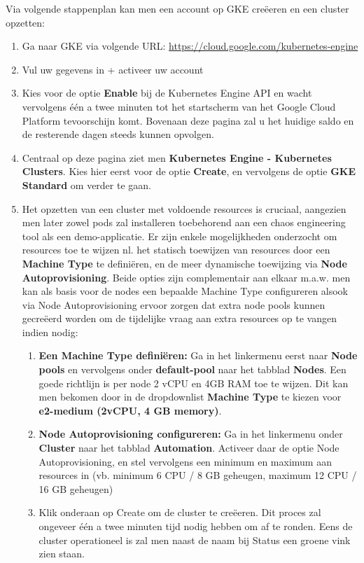 Via volgende stappenplan kan men een account op GKE creëeren en een cluster opzetten: 
\begin{enumerate}
    \item Ga naar GKE via volgende URL: \url{https://cloud.google.com/kubernetes-engine}
    \item Vul uw gegevens in + activeer uw account
    \item Kies voor de optie {\bf Enable} bij de Kubernetes Engine API en wacht vervolgens één a twee minuten tot het startscherm van het Google Cloud Platform tevoorschijn komt. Bovenaan deze pagina zal u het huidige saldo en de resterende dagen steeds kunnen opvolgen.
    \item Centraal op deze pagina ziet men {\bf Kubernetes Engine - Kubernetes Clusters}. Kies hier eerst voor de optie {\bf Create}, en vervolgens de optie {\bf GKE Standard} om verder te gaan. 
    \item Het opzetten van een cluster met voldoende resources is cruciaal, aangezien men later zowel pods zal installeren toebehorend aan een chaos engineering tool als een demo-applicatie. 
    \newline Er zijn enkele mogelijkheden onderzocht om resources toe te wijzen nl. het statisch toewijzen van resources door een {\bf Machine Type} te definiëren, en de meer dynamische toewijzing via {\bf Node Autoprovisioning}. Beide opties zijn complementair aan elkaar m.a.w. men kan als basis voor de nodes een bepaalde Machine Type configureren alsook via Node Autoprovisioning ervoor zorgen dat extra node pools kunnen gecreëerd worden om de tijdelijke vraag aan extra resources op te vangen indien nodig:  
    \begin{enumerate}
        \item {\bf Een Machine Type definiëren:} Ga in het linkermenu eerst naar {\bf Node pools} en vervolgens onder {\bf default-pool} naar het tabblad {\bf Nodes}. Een goede richtlijn is per node 2 vCPU en 4GB RAM toe te wijzen. Dit kan men bekomen door in de dropdownlist {\bf Machine Type} te kiezen voor {\bf e2-medium (2vCPU, 4 GB memory)}.
        \item {\bf Node Autoprovisioning configureren:} Ga in het linkermenu onder {\bf Cluster} naar het tabblad {\bf Automation}. Activeer daar de optie Node Autoprovisioning, en stel vervolgens een minimum en maximum aan resources in (vb. minimum 6 CPU / 8 GB geheugen, maximum 12 CPU / 16 GB geheugen)
        \item Klik onderaan op Create om de cluster te creëeren. Dit proces zal ongeveer één a twee minuten tijd nodig hebben om af te ronden. Eens de cluster operationeel is zal men naast de naam bij Status een groene vink zien staan.

\end{enumerate}
\end{enumerate}
